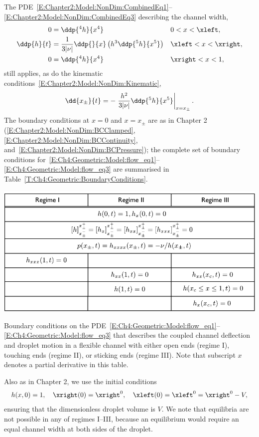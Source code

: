 The PDE~\eqref{E:Chapter2:Model:NonDim:CombinedEq1}--\eqref{E:Chapter2:Model:NonDim:CombinedEq3} describing the channel width,
\begin{align}
0 &= \ddp{^4 h}{x^4} & &0 < x < \xleft,\label{E:Ch4:Geometric:Model:flow_eq1}\\
\ddp{h}{t} &= \frac{1}{3|\nu|}\ddp{}{x}\left(h^3 \ddp{^5 h}{x^5}\right) & &\xleft < x <\xright, \\
0 &= \ddp{^4 h}{x^4} & &\xright < x < 1,\label{E:Ch4:Geometric:Model:flow_eq3}
\end{align}
still applies, as do the kinematic conditions~\eqref{E:Chapter2:Model:NonDim:Kinematic},
\begin{equation}\label{E:Ch4:Geometric:Model:kinematic}
\dd{x_{\pm}}{t} = -\left.\frac{h^2}{3|\nu|}\ddp{^5 h}{x^5}\right|_{x = x_{\pm}}.
\end{equation}
The boundary conditions at $x = 0$ and $x = x_{\pm}$ are as in Chapter 2 (\eqref{E:Chapter2:Model:NonDim:BCClamped}, \eqref{E:Chapter2:Model:NonDim:BCContinuity}, and~\eqref{E:Chapter2:Model:NonDim:BCPressure}); the complete set of boundary conditions for~\eqref{E:Ch4:Geometric:Model:flow_eq1}--\eqref{E:Ch4:Geometric:Model:flow_eq3} are summarised in Table~\ref{T:Ch4:Geometric:BoundaryConditions}.

\begin{table}[t!]
 \includegraphics[scale = 0.99]{table_of_bc}
   \caption{Boundary conditions on the PDE~\eqref{E:Ch4:Geometric:Model:flow_eq1}--\eqref{E:Ch4:Geometric:Model:flow_eq3} that describes the coupled channel deflection and droplet motion in a flexible channel with either open ends (regime I), touching ends (regime II), or sticking ends (regime III). Note that subscript $x$ denotes a partial derivative in this table.}  \label{T:Ch4:Geometric:BoundaryConditions}
\end{table}

Also as in Chapter 2, we use the initial conditions
\begin{equation}\label{E:Ch4:Geometric:Model:IC}
h(x, 0) = 1,\quad \xright(0) = \xright^0, \quad \xleft(0) =\xleft^0 =  \xright^0 - V,
\end{equation}
ensuring that the dimensionless droplet volume is $V$. We note that equilibria are not possible in any of regimes I--III, because an equilibrium would require an equal channel width at both sides of the droplet.

